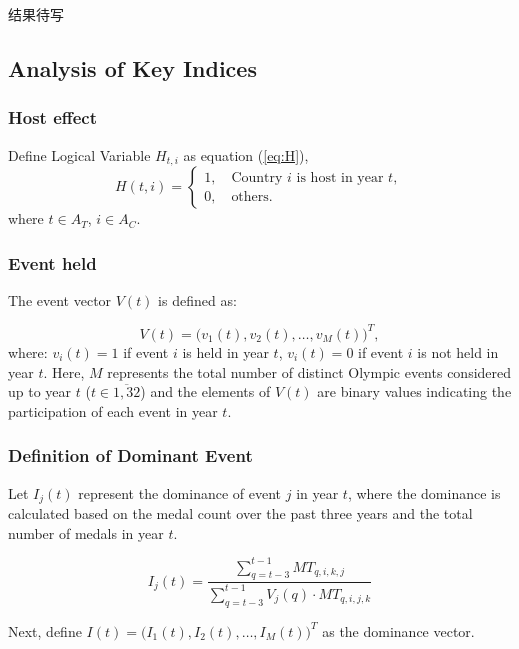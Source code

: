 \documentclass{mcmthesis}
\begin{document}
	结果待写
	
	
	
	\subsection{Analysis of Key Indices}
	\subsubsection{Host effect}
	
	Define Logical Variable $H_{t,i}$ as equation (\ref{eq:H}),
	\begin{equation}
		H(t,i)=
		\begin{cases}
			1, \quad \text{Country } i \text{ is host in year } t, \\
			0, \quad \text{others}.
		\end{cases}
		\label{eq:H}
	\end{equation}
	where $t\in A_{T}$, $i\in A_{C}$.
	
	
	
	\subsubsection{Event held}
	The event vector \( V(t) \) is defined as:
	
	\[
	V(t) = \big( v_1(t), v_2(t), \dots, v_M(t) \big)^T,
	\]
	where: \( v_i(t) = 1 \) if event \( i \) is held in year \( t \),
	\( v_i(t) = 0 \) if event \( i \) is not held in year \( t \). Here, \( M \) represents the total number of distinct Olympic events considered up to year \( t \) ($t\in\overline{1,32}$) and the elements of \( V(t) \) are binary values indicating the participation of each event in year \( t \).
	
	
	
\subsubsection{Definition of Dominant Event}

Let \( I_j(t) \) represent the dominance of event \( j \) in year \( t \), where the dominance is calculated based on the medal count over the past three years and the total number of medals in year \( t \).

\[
I_j(t) = \frac{\sum_{q=t-3}^{t-1} MT_{q,i,k,j}}{\sum_{q=t-3}^{t-1} V_j(q) \cdot MT_{q,i,j,k}} 
\]

Next, define \( I(t) = \big( I_1(t), I_2(t), \dots, I_M(t) \big)^T \) as the dominance vector. 
\end{document}
